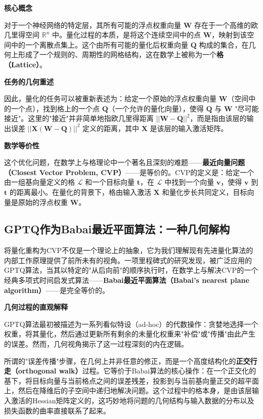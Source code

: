 \documentclass[letterpaper,twocolumn,10pt]{article}
\begin{document}
\textbf{核心概念}

对于一个神经网络的特定层，其所有可能的浮点权重向量 $\mathbf{W}$ 存在于一个高维的欧几里得空间 $\mathbb{R}^n$ 中。量化过程的本质，是将这个连续空间中的点 $\mathbf{W}$，映射到该空间中的一个离散点集上。这个由所有可能的量化后权重向量 $\mathbf{Q}$ 构成的集合，在几何上形成了一个规则的、周期性的网格结构，这在数学上被称为一个\textbf{格（Lattice）}。

\textbf{任务的几何重述}

因此，量化的任务可以被重新表述为：给定一个原始的浮点权重向量 $\mathbf{W}$（空间中的一个点），找到格上的一个点 $\mathbf{Q}$（一个允许的量化向量），使得 $\mathbf{Q}$ 与 $\mathbf{W}$ "尽可能接近"。这里的"接近"并非简单地指欧几里得距离 $||\mathbf{W} - \mathbf{Q}||^2$，而是指由该层的输出误差 $||\mathbf{X}(\mathbf{W} - \mathbf{Q})||^2$ 定义的距离，其中 $\mathbf{X}$ 是该层的输入激活矩阵。

\textbf{数学等价性}

这个优化问题，在数学上与格理论中一个著名且深刻的难题——\textbf{最近向量问题（Closest Vector Problem, CVP）}——是等价的。CVP的定义是：给定一个由一组基向量定义的格 $\mathcal{L}$ 和一个目标向量 $\mathbf{t}$，在 $\mathcal{L}$ 中找到一个向量 $\mathbf{v}$，使得 $\mathbf{v}$ 到 $\mathbf{t}$ 的距离最小。在量化的背景下，格由输入激活 $\mathbf{X}$ 和量化步长共同定义，目标向量是原始的浮点权重 $\mathbf{W}$。

\subsection{GPTQ作为Babai最近平面算法：一种几何解构}

将量化重构为CVP不仅是一个理论上的抽象，它为我们理解现有先进量化算法的内部工作原理提供了前所未有的视角。一项里程碑式的研究发现，被广泛应用的GPTQ算法，当其以特定的"从后向前"的顺序执行时，在数学上与解决CVP的一个经典多项式时间启发式算法——\textbf{Babai最近平面算法（Babai's nearest plane algorithm）}——是完全等价的。

\textbf{几何过程的直观解释}

GPTQ算法最初被描述为一系列看似特设（ad-hoc）的代数操作：贪婪地选择一个权重，将其量化，然后通过更新所有剩余的未量化权重来"补偿"或"传播"由此产生的误差。然而，几何视角揭示了这一过程深刻的内在逻辑。

所谓的"误差传播"步骤，在几何上并非任意的修正，而是一个高度结构化的\textbf{正交行走（orthogonal walk）}过程。它等价于Babai算法的核心操作：在一个正交化的基下，将目标向量与当前格点之间的误差残差，投影到与当前基向量正交的超平面上，然后在降维后的子空间中递归地解决问题。这个过程中的格本身，是由该层输入激活的Hessian矩阵定义的，这巧妙地将问题的几何结构与输入数据的分布以及损失函数的曲率直接联系了起来。
\end{document}
